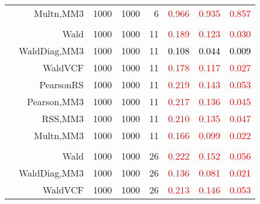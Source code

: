 \documentclass[
]{article}
\begin{document}
\begin{table}[H]
{\begin{tabular}[t]{lrrrrrrr}
\hspace{1em} & Multn,MM3 & 1000 & 1000 & 6 & \textcolor{red}{0.966} & \textcolor{red}{0.935} & \textcolor{red}{0.857}\\
\cmidrule{1-8}
\addlinespace[0.3em]
\multicolumn{8}{l}{\textbf{2F 10V}}\\
\hspace{1em} & Wald & 1000 & 1000 & 11 & \textcolor{red}{0.189} & \textcolor{red}{0.123} & \textcolor{red}{0.030}\\

\hspace{1em} & WaldDiag,MM3 & 1000 & 1000 & 11 & \textcolor{black}{0.108} & \textcolor{black}{0.044} & \textcolor{black}{0.009}\\

\hspace{1em} & WaldVCF & 1000 & 1000 & 11 & \textcolor{red}{0.178} & \textcolor{red}{0.117} & \textcolor{red}{0.027}\\

\hspace{1em} & PearsonRS & 1000 & 1000 & 11 & \textcolor{red}{0.219} & \textcolor{red}{0.143} & \textcolor{red}{0.053}\\

\hspace{1em} & Pearson,MM3 & 1000 & 1000 & 11 & \textcolor{red}{0.217} & \textcolor{red}{0.136} & \textcolor{red}{0.045}\\

\hspace{1em} & RSS,MM3 & 1000 & 1000 & 11 & \textcolor{red}{0.210} & \textcolor{red}{0.135} & \textcolor{red}{0.047}\\

\hspace{1em} & Multn,MM3 & 1000 & 1000 & 11 & \textcolor{red}{0.166} & \textcolor{red}{0.099} & \textcolor{red}{0.022}\\
\cmidrule{1-8}
\addlinespace[0.3em]
\multicolumn{8}{l}{\textbf{3F 15V}}\\
\hspace{1em} & Wald & 1000 & 1000 & 26 & \textcolor{red}{0.222} & \textcolor{red}{0.152} & \textcolor{red}{0.056}\\

\hspace{1em} & WaldDiag,MM3 & 1000 & 1000 & 26 & \textcolor{red}{0.136} & \textcolor{red}{0.081} & \textcolor{red}{0.021}\\

\hspace{1em} & WaldVCF & 1000 & 1000 & 26 & \textcolor{red}{0.213} & \textcolor{red}{0.146} & \textcolor{red}{0.053}\\


\end{tabular}}
\end{table}
\end{document}
